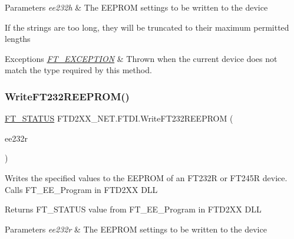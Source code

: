 \begin{DoxyParams}{Parameters}
{\em ee232h} & The E\+E\+P\+R\+OM settings to be written to the device\\
\hline
\end{DoxyParams}


If the strings are too long, they will be truncated to their maximum permitted lengths


\begin{DoxyExceptions}{Exceptions}
{\em \mbox{\hyperlink{class_f_t_d2_x_x___n_e_t_1_1_f_t_d_i_1_1_f_t___e_x_c_e_p_t_i_o_n}{F\+T\+\_\+\+E\+X\+C\+E\+P\+T\+I\+ON}}} & Thrown when the current device does not match the type required by this method.\\
\hline
\end{DoxyExceptions}
\mbox{\label{class_f_t_d2_x_x___n_e_t_1_1_f_t_d_i_a225cc45ca6451e2e5c17f2bb7fd27d9e}} 
\subsubsection{\texorpdfstring{WriteFT232REEPROM()}{WriteFT232REEPROM()}}
{\footnotesize\ttfamily \mbox{\hyperlink{class_f_t_d2_x_x___n_e_t_1_1_f_t_d_i_aabe20ad905cc4ccc1e35dd5b877d9a83}{F\+T\+\_\+\+S\+T\+A\+T\+US}} F\+T\+D2\+X\+X\+\_\+\+N\+E\+T.\+F\+T\+D\+I.\+Write\+F\+T232\+R\+E\+E\+P\+R\+OM (\begin{DoxyParamCaption}\item[{\mbox{\hyperlink{class_f_t_d2_x_x___n_e_t_1_1_f_t_d_i_1_1_f_t232_r___e_e_p_r_o_m___s_t_r_u_c_t_u_r_e}{F\+T232\+R\+\_\+\+E\+E\+P\+R\+O\+M\+\_\+\+S\+T\+R\+U\+C\+T\+U\+RE}}}]{ee232r }\end{DoxyParamCaption})}



Writes the specified values to the E\+E\+P\+R\+OM of an F\+T232R or F\+T245R device. Calls F\+T\+\_\+\+E\+E\+\_\+\+Program in F\+T\+D2\+XX D\+LL 

\begin{DoxyReturn}{Returns}
F\+T\+\_\+\+S\+T\+A\+T\+US value from F\+T\+\_\+\+E\+E\+\_\+\+Program in F\+T\+D2\+XX D\+LL
\end{DoxyReturn}

\begin{DoxyParams}{Parameters}
{\em ee232r} & The E\+E\+P\+R\+OM settings to be written to the device\\
\hline
\end{DoxyParams}


